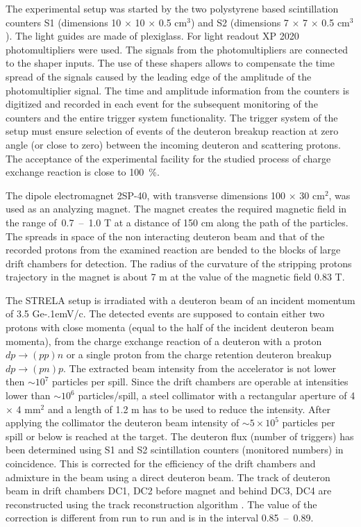 \documentclass[twocolumn,epjc3]{svjour3}
\newcommand{\dpchex} {\ensuremath{dp \rightarrow (pp)n}\xspace}
\newcommand{\dpret}  {\ensuremath{dp \rightarrow (pn)p}\xspace}
\newcommand{\GeVc}   {Ge\kern-.1emV/c\xspace}
\begin{document}
The experimental setup was started by the two polysty\-rene based scintillation
counters S1 (dimensions 10 $\times$ 10 $\times$ 0.5 cm$^3$) and S2 (dimensions 7
$\times$ 7 $\times$ 0.5 cm$^3$). The light guides are made of plexiglass. For
light readout XP 2020 photomultipliers were used. The signals from the
photomultipliers are connected to the shaper inputs. The use of these shapers
allows to compensate the time spread of the signals caused by the leading edge
of the amplitude of the photomultiplier signal. The time and amplitude
information from the counters is digitized and recorded in each event for the
subsequent monitoring of the counters and the entire trigger system
functionality. The trigger system of the setup must ensure selection of events
of the deuteron breakup reaction at zero angle (or close to zero) between the
incoming deuteron and scattering protons. The acceptance of the experimental
facility for the studied process of charge exchange reaction is close to 100~\%.

The dipole electromagnet 2SP-40, with transverse dimensions 100 $\times$ 30
cm$^2$, was used as an analyzing magnet. The magnet creates the required
magnetic field in the range of \,0.7~--~1.0 T at a distance of 150 cm along the
path of the particles. The spreads in space of the non interacting deuteron beam
and that of the recorded protons from the examined reaction are bended to the
blocks of large drift chambers for detection. The radius of the curvature of the
stripping protons trajectory in the magnet is about 7 m at the value of the
magnetic field 0.83 T.

The STRELA setup is irradiated with a deuteron beam of an incident momentum of
3.5 \GeVc. The detected events are supposed to contain either two protons with
close momenta (equal to the half of the incident deuteron beam momenta), from
the charge exchange reaction of a deuteron with a proton \dpchex or a single
proton from the charge retention deuteron breakup \dpret. The extracted beam
intensity from the accelerator is not lower then $\sim 10^{7}$ particles per
spill. Since the drift chambers are operable at intensities lower than
$\sim 10^{6}$ particles/spill, a steel collimator with a rectangular aperture of
4 $\times$ 4 mm$^2$ and a length of 1.2 m has to be used to reduce the
intensity. After applying the collimator the deuteron beam intensity of
$\sim 5\times10^5$ particles per spill or below is reached at the target. The
deuteron flux (number of triggers) has been determined using S1 and S2
scintillation counters (monitored numbers) in coincidence. This is corrected for
the efficiency of the drift chambers and admixture in the beam using a direct
deuteron beam. The track of deuteron beam in drift chambers DC1, DC2 before
magnet and behind DC3, DC4 are reconstructed using the track reconstruction
algorithm \cite{gla13}. The value of the correction is different from run to run
and is in the interval 0.85~--~0.89.
\end{document}
